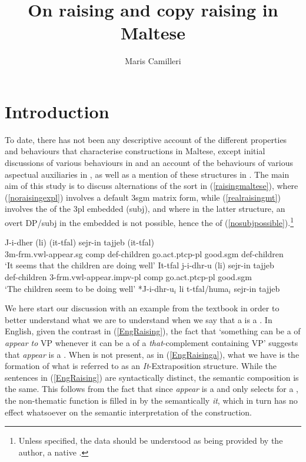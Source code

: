 \documentclass[output=paper]{LSP/langsci}
\author{Maris Camilleri\affiliation{University of Essex}}
\title{On raising and copy raising in Maltese}
\begin{document}
\section{Introduction} 

To date, there has not been any descriptive account of the different properties and behaviours that characterise  constructions in Maltese, except initial discussions of various behaviours in  and an account of the  behaviours of various aspectual auxiliaries in , as well as a mention of these structures in . The main aim of this study is to discuss alternations of the sort in (\ref{raisingmaltese}), where (\ref{noraisingexpl}) involves a default {\sc 3sgm} matrix form, while (\ref{realraisingmt}) involves the  of the {\sc 3pl} embedded  ({\sc subj}), and where in the latter structure, an overt DP/{\sc subj} in the embedded  is not possible, hence the  of (\ref{nosubjpossible}).\footnote{Unless specified, the data should be understood as being provided by the author, a native .} 

\ea \label{raisingmaltese}
\ea \label{noraisingexpl}
\gll J-i-dher (li) (it-tfal) sejr-in tajjeb (it-tfal){\footnotemark}\\
3{\sc m}-{\sc frm.vwl}-appear.{\sc sg} {\sc comp} {\sc def-}children go.{\sc act.ptcp-pl} good.{\sc sgm} {\sc def-}children\\
\glt `It seems that the children are doing well'
\ex \label{realraisingmt}
\gll It-tfal j-i-dhr-u (li) sejr-in tajjeb\\
{\sc def-}children 3-{\sc frm.vwl}-appear.{\sc impv-pl} {\sc comp} go.{\sc act.ptcp-pl} good.{\sc sgm}\\
\glt `The children seem to be doing well'
\ex \label{nosubjpossible} *J-i-dhr-u$_{i}$ li t-tfal/huma$_{i}$ sejr-in tajjeb
\z
\z  

We here start our discussion with an example from the  textbook in order to better understand what we are to understand when we say that a  is a . In English, given the contrast in (\ref{EngRaising}), the fact that `something can be a  of \emph{appear to} VP whenever it can be a  of a \emph{that}-complement containing VP' suggests that \emph{appear} is a . When  is not present, as in (\ref{EngRaisinga}), what we have is the formation of what is referred to as an \emph{It}-Extraposition structure. While the sentences in (\ref{EngRaising}) are syntactically distinct, the semantic composition is the same. This follows from the fact that since \emph{appear} is a  and only selects for a , the non-thematic  function is filled in by the semantically  \emph{it}, which in turn has no effect whatsoever on the semantic interpretation of the construction.
\end{document}
